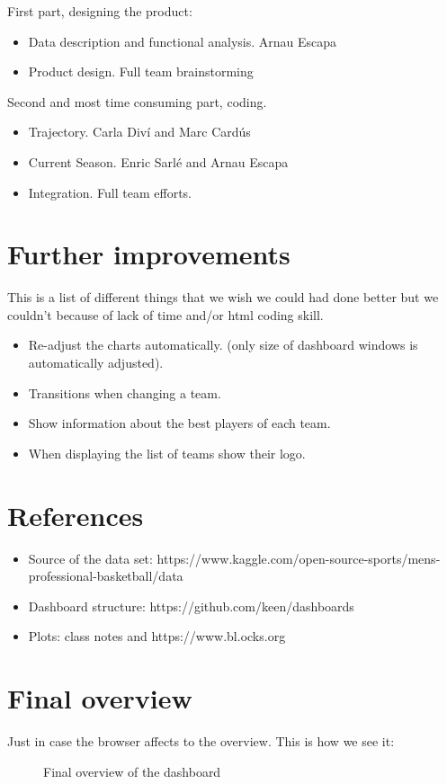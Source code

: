 \documentclass[11pt, a4paper]{article}
\begin{document}
\medskip
First part, designing the product:
\begin{itemize}

\item Data description and functional analysis. Arnau Escapa 

\item Product design. Full team brainstorming 
\end{itemize}
Second and most time consuming part, coding.
\begin{itemize}
\item Trajectory. Carla Diví  and Marc Cardús
\item Current Season. Enric Sarlé and Arnau Escapa
\item Integration. Full team efforts.
\end{itemize}


\section{Further improvements}
This is a list of different things that we wish we could had done better but we couldn't because of lack of time and/or html coding skill.
\begin{itemize}
\item Re-adjust the charts automatically. (only size of dashboard windows is automatically adjusted).
\item Transitions when changing a team. 
\item Show information about the best players of each team.
\item When displaying the list of teams show their logo.
\end{itemize}
\section{References}
\begin{itemize}
\item Source of the data set: https://www.kaggle.com/open-source-sports/mens-professional-basketball/data
\item Dashboard structure: https://github.com/keen/dashboards
\item Plots: class notes and https://www.bl.ocks.org

\end{itemize}
\section{Final overview}
Just in case the browser affects to the overview. This is how we see it:

\bigskip
\begin{figure}[H]
\centering
\caption{Final overview of the dashboard}
\end{figure}
\end{document}

